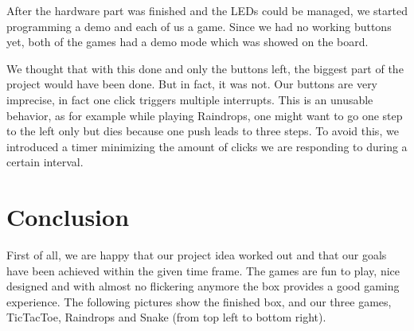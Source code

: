 \documentclass[a4paper,12pt]{article}
\begin{document}
After the hardware part was finished and the LEDs could be managed, we started programming a demo and each of us a game.
 Since we had no working buttons yet, both of the games had a demo mode which was showed on the board.

We thought that with this done and only the buttons left, the biggest part of the project would have been done.
 But in fact, it was not.
 Our buttons are very imprecise, in fact one click triggers multiple interrupts.
 This is an unusable behavior, as for example while playing Raindrops, one might want to go one step to the left only but dies because one push leads to three steps.
 To avoid this, we introduced a timer minimizing the amount of clicks we are responding to during a certain interval.

\section{Conclusion}
First of all, we are happy that our project idea worked out and that our goals have been achieved within the given time frame.
 The games are fun to play, nice designed and with almost no flickering anymore the box provides a good gaming experience.
 The following pictures show the finished box, and our three games, TicTacToe, Raindrops and Snake (from top left to bottom right).
 
\end{document}
